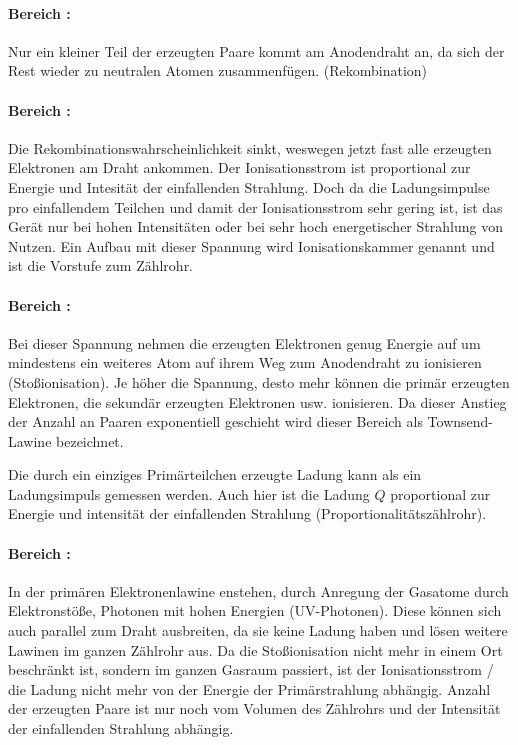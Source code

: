 \documentclass[titlepage = firstcover]{scrartcl}
\newcommand{\RN}[1]{\uppercase\expandafter{\romannumeral#1}}
\begin{document}
          \paragraph{Bereich \RN{1}:}
            Nur ein kleiner Teil der erzeugten Paare kommt am Anodendraht an, da sich der Rest wieder zu neutralen Atomen zusammenfügen. (Rekombination)

          \paragraph{Bereich \RN{2}:}
            Die Rekombinationswahrscheinlichkeit sinkt, weswegen jetzt fast alle erzeugten Elektronen am Draht ankommen. Der Ionisationsstrom ist proportional zur Energie und Intesität der einfallenden Strahlung. Doch da die Ladungsimpulse pro einfallendem Teilchen und damit der Ionisationsstrom sehr gering ist, ist das Gerät nur bei hohen Intensitäten oder bei sehr hoch energetischer Strahlung von Nutzen. Ein Aufbau mit dieser Spannung wird Ionisationskammer genannt und ist die Vorstufe zum Zählrohr.

          \paragraph{Bereich \RN{3}:} \label{par:stossionisation}
            Bei dieser Spannung nehmen die erzeugten Elektronen genug Energie auf um mindestens ein weiteres Atom auf ihrem Weg zum Anodendraht zu ionisieren (Stoßionisation). Je höher die Spannung, desto mehr können die primär erzeugten Elektronen, die sekundär erzeugten Elektronen usw. ionisieren. Da dieser Anstieg der Anzahl an Paaren exponentiell geschieht wird dieser Bereich als Townsend-Lawine bezeichnet.

            Die durch ein einziges Primärteilchen erzeugte Ladung kann als ein Ladungsimpuls gemessen werden. Auch hier ist die Ladung $Q$ proportional zur Energie und intensität der einfallenden Strahlung (Proportionalitätszählrohr).

          \paragraph{Bereich \RN{4}:}
            In der primären Elektronenlawine enstehen, durch Anregung der Gasatome durch Elektronstöße, Photonen mit hohen Energien (UV-Photonen). Diese können sich auch parallel zum Draht ausbreiten, da sie keine Ladung haben und lösen weitere Lawinen im ganzen Zählrohr aus. Da die Stoßionisation nicht mehr in einem Ort beschränkt ist, sondern im ganzen Gasraum passiert, ist der Ionisationsstrom / die Ladung nicht mehr von der Energie der Primärstrahlung abhängig. Anzahl der erzeugten Paare ist nur noch vom Volumen des Zählrohrs und der Intensität der einfallenden Strahlung abhängig.
\end{document}
